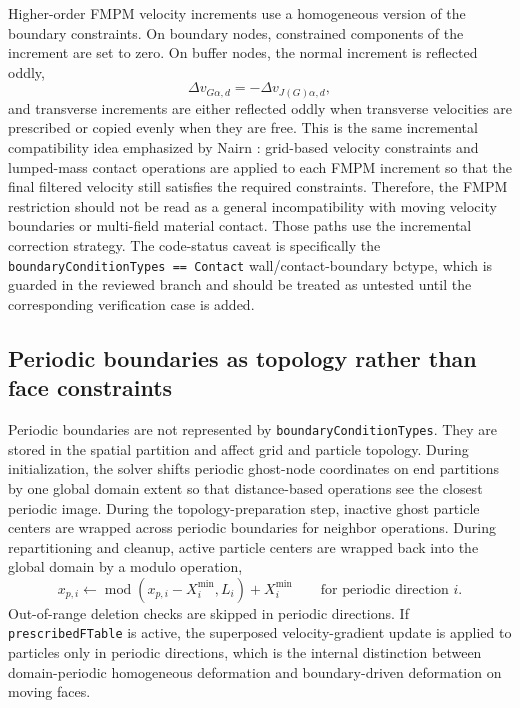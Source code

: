 Higher-order FMPM velocity increments use a homogeneous version of the boundary constraints.  On boundary nodes, constrained components of the increment are set to zero.  On buffer nodes, the normal increment is reflected oddly,
\begin{equation}
  \Delta v_{G\alpha,d}=-\Delta v_{J(G)\alpha,d},
\end{equation}
and transverse increments are either reflected oddly when transverse velocities are prescribed or copied evenly when they are free.  This is the same incremental compatibility idea emphasized by Nairn \cite{nairn2026fmpm}: grid-based velocity constraints and lumped-mass contact operations are applied to each FMPM increment so that the final filtered velocity still satisfies the required constraints.  Therefore, the FMPM restriction should not be read as a general incompatibility with moving velocity boundaries or multi-field material contact.  Those paths use the incremental correction strategy.  The code-status caveat is specifically the \texttt{boundaryConditionTypes == Contact} wall/contact-boundary bctype, which is guarded in the reviewed branch and should be treated as untested until the corresponding verification case is added.

\subsection{Periodic boundaries as topology rather than face constraints}
\label{subsec:bc-periodic-internals}

Periodic boundaries are not represented by \texttt{boundaryConditionTypes}.  They are stored in the spatial partition and affect grid and particle topology.  During initialization, the solver shifts periodic ghost-node coordinates on end partitions by one global domain extent so that distance-based operations see the closest periodic image.  During the topology-preparation step, inactive ghost particle centers are wrapped across periodic boundaries for neighbor operations.  During repartitioning and cleanup, active particle centers are wrapped back into the global domain by a modulo operation,
\begin{equation}
  x_{p,i}\leftarrow \operatorname{mod}(x_{p,i}-X_i^{\min},L_i)+X_i^{\min}
  \qquad\text{for periodic direction } i.
  \label{eq:bc-periodic-wrap}
\end{equation}
Out-of-range deletion checks are skipped in periodic directions.  If \texttt{prescribedFTable} is active, the superposed velocity-gradient update is applied to particles only in periodic directions, which is the internal distinction between domain-periodic homogeneous deformation and boundary-driven deformation on moving faces.


